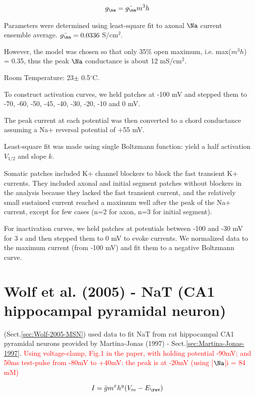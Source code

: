 \begin{equation}
g_\na = \bar{g_\na} m^3 h
\end{equation}

Parameters were determined using least-square fit to axonal $\Na$ current
ensemble average. $\bar{g_\na} = 0.0336$ S/cm$^2$. 

However, the model was chosen so that only 35\% open maximum, i.e. max($m^3h$) =
0.35, thus the peak $\Na$ conductance is about 12 mS/cm$^2$.


Room Temperature: 23$\pm$ 0.5$^\circ$C.

To construct activation curves, we held patches at -100 mV and stepped
them to -70, -60, -50, -45, -40, -30, -20, -10 and 0 mV. 

The peak current at each potential was then converted to a chord conductance
assuming a Na+ reversal potential of +55 mV.

Least-square fit was made using single Boltzmann function: yield a half
activation $V_{1/2}$ and slope $k$.


Somatic patches included K+ channel blockers to block the fast transient K+
currents. They included axonal and initial segment patches without
blockers in the analysis because they lacked the fast transient current, and the
relatively small sustained current reached a maximum well after the peak of the
Na+ current, except for few cases (n=2 for axon, n=3 for initial segment).

For inactivation curves, we held patches at potentials between -100 and -30 mV
for 3 s and then stepped them to 0 mV to evoke currents.
We normalized
data to the maximum current (from -100 mV) and fit them to a negative
Boltzmann curve.






\section{Wolf et al. (2005) - NaT (CA1 hippocampal pyramidal neuron)}
\label{sec:NaT-Wolf-2005}

\citep{wolf2005} (Sect.\ref{sec:Wolf-2005-MSN}) used data to fit NaT from rat
hippocampal CA1 pyramidal neurons provided by Martina-Jonas (1997) -
Sect.\ref{sec:Martina-Jonas-1997}. \textcolor{red}{Using voltage-clamp, Fig.1 in
the paper, with holding potential -90mV; and 50ms test-pulse from -80mV to
+40mV: the peak is at -20mV (using [$\Na$]i = 84 mM)}
 
\begin{equation}
I  = \bar{g} m^x h^y (V_m - E_\rev)
\end{equation}

